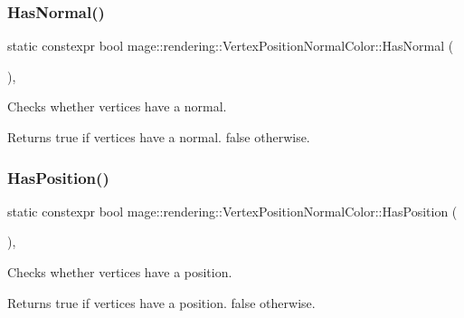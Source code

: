 \subsubsection{\texorpdfstring{Has\+Normal()}{HasNormal()}}
{\footnotesize\ttfamily static constexpr bool mage\+::rendering\+::\+Vertex\+Position\+Normal\+Color\+::\+Has\+Normal (\begin{DoxyParamCaption}{ }\end{DoxyParamCaption})\hspace{0.3cm}{\ttfamily [static]}, {\ttfamily [noexcept]}}

Checks whether vertices have a normal.

\begin{DoxyReturn}{Returns}
{\ttfamily true} if vertices have a normal. {\ttfamily false} otherwise. 
\end{DoxyReturn}
\hypertarget{structmage_1_1rendering_1_1_vertex_position_normal_color_a1a40ced9702b3aa3a8f32ea932448aa1}{}\label{structmage_1_1rendering_1_1_vertex_position_normal_color_a1a40ced9702b3aa3a8f32ea932448aa1} 
\subsubsection{\texorpdfstring{Has\+Position()}{HasPosition()}}
{\footnotesize\ttfamily static constexpr bool mage\+::rendering\+::\+Vertex\+Position\+Normal\+Color\+::\+Has\+Position (\begin{DoxyParamCaption}{ }\end{DoxyParamCaption})\hspace{0.3cm}{\ttfamily [static]}, {\ttfamily [noexcept]}}

Checks whether vertices have a position.

\begin{DoxyReturn}{Returns}
{\ttfamily true} if vertices have a position. {\ttfamily false} otherwise. 
\end{DoxyReturn}
\hypertarget{structmage_1_1rendering_1_1_vertex_position_normal_color_aef3b7dd4f11d7f2a78fe29c49b8bf6f5}{}\label{structmage_1_1rendering_1_1_vertex_position_normal_color_aef3b7dd4f11d7f2a78fe29c49b8bf6f5} 

